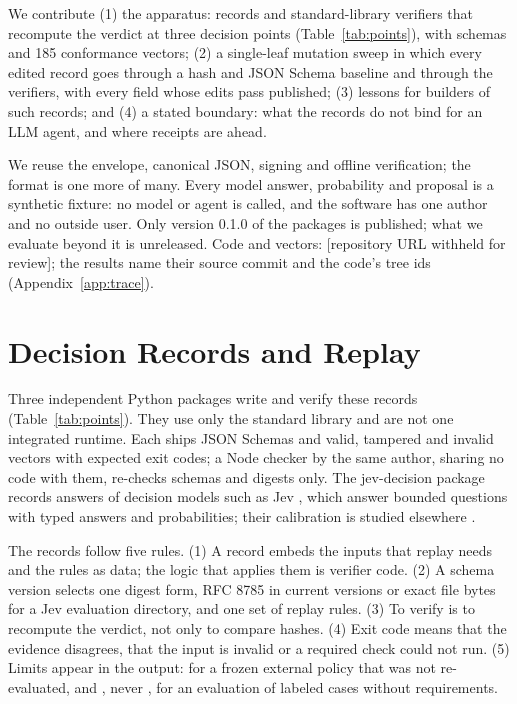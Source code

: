 \documentclass[letterpaper]{article} %
\makeatletter
\def\code@keepspaces{\Url@Edit\Url@String{ }{+}}}
\DeclareRobustCommand{\code}{\leavevmode\begingroup \urlstyle{tt}%
  \let\Url@ObeySp\code@keepspaces \def\Url@space{\penalty\UrlBreakPenalty\ }\Url}
\DeclareRobustCommand{\repourl}{[repository URL withheld for review]}
\DeclareRobustCommand{\repourl}{\expandafter\url\expandafter{\paperrepourl}}
\makeatother
\begin{document}
We contribute (1) the apparatus: records and standard-library verifiers that
recompute the verdict at three decision points (Table~\ref{tab:points}), with
schemas and 185 conformance vectors; (2) a single-leaf mutation sweep in
which every edited record goes through a hash and JSON Schema baseline and
through the verifiers, with every field whose edits pass published; (3)
lessons for builders of such records; and (4) a stated boundary: what the
records do not bind for an LLM agent, and where receipts are ahead.

We reuse the envelope, canonical JSON, signing and offline verification; the
format is one more of many. Every model
answer, probability and proposal is a synthetic fixture: no model or agent
is called, and the software has one author and no outside user. Only version
0.1.0 of the packages is published; what we evaluate beyond it is
unreleased. Code and vectors: \repourl{}; the results name their source
commit and the code's tree ids (Appendix~\ref{app:trace}).

\section{Decision Records and Replay}
\label{sec:records}

Three independent Python packages write and verify these records
(Table~\ref{tab:points}). They use only the standard library and are not one
integrated runtime. Each ships JSON Schemas \citep{wright2022jsonschema} and
valid, tampered and invalid vectors with expected exit codes; a Node checker
by the same author, sharing no code with them, re-checks schemas and digests
only. The jev-decision package records answers of decision models such as
Jev \citep{almeida2026jev}, which answer bounded questions with typed answers
and probabilities; their calibration is studied elsewhere
\citep{deusser2026jev}.

The records follow five rules. (1) A record embeds the inputs that replay
needs and the rules as data; the logic that applies them is verifier code.
(2) A schema version selects one digest form, RFC 8785
\citep{rundgren2020jcs} in current versions or exact file bytes for a Jev
evaluation directory, and one set of replay rules. (3) To verify is to
recompute the verdict, not only to compare hashes. (4) Exit code \code{1}
means that the evidence disagrees, \code{2} that the input is invalid or a
required check could not run. (5) Limits appear in the output:
\code{digest-only} for a frozen external policy that was not re-evaluated,
and \code{UNGATED}, never \code{PASS}, for an evaluation of labeled cases
without requirements.
\end{document}
